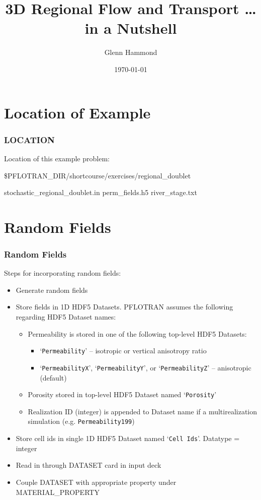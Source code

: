 \documentclass{beamer}
\begin{document}
\title{3D Regional Flow and Transport \ldots in a Nutshell}
\author{Glenn Hammond}
\date{\today}


\section{Location of Example}

\begin{frame}\frametitle{LOCATION}

Location of this example problem:

\begin{semiverbatim}
\$PFLOTRAN_DIR/shortcourse/exercises/regional_doublet

stochastic_regional_doublet.in
perm_fields.h5
river_stage.txt
\end{semiverbatim}

\end{frame}

\section{Random Fields}

\begin{frame}\frametitle{Random Fields}

Steps for incorporating random fields:
  \begin{itemize}
    \item Generate random fields
    \item Store fields in 1D HDF5 Datasets. PFLOTRAN assumes the following regarding HDF5 Dataset names:
      \begin{itemize}
        \item Permeability is stored in one of the following top-level HDF5 Datasets:
        \begin{itemize}
          \item `\verb=Permeability=' -- isotropic or vertical anisotropy ratio
          \item `\verb=PermeabilityX=', `\verb=PermeabilityY=', or `\verb=PermeabilityZ=' -- anisotropic (default)
        \end{itemize}
        \item Porosity stored in top-level HDF5 Dataset named `\verb=Porosity='
        \item Realization ID (integer) is appended to Dataset name if a multirealization simulation (e.g. \verb=Permeability199=)
      \end{itemize}
    \item Store cell ids in single 1D HDF5 Dataset named `\verb=Cell Ids='. Datatype = integer
    \item Read in through DATASET card in input deck
    \item Couple DATASET with appropriate property under MATERIAL\_PROPERTY
  \end{itemize}

\end{frame}
\end{document}
